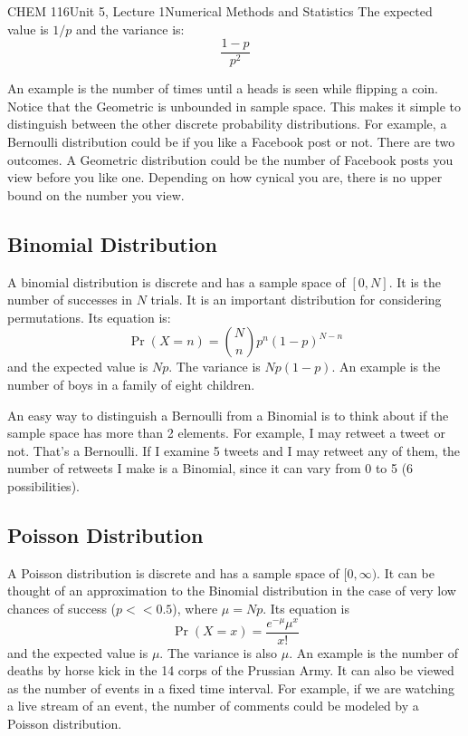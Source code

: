 \documentclass{article}
\begin{document}
\begin{tdoc}{CHEM 116}{Unit 5, Lecture 1}{Numerical Methods and Statistics}
The expected value is $1 / p$ and the variance is: 
\begin{equation}
\frac{1 - p}{p^2}
\end{equation}

An example is the number of times until a heads is seen while flipping
a coin. Notice that the Geometric is unbounded in sample space. This
makes it simple to distinguish between the other discrete probability
distributions. For example, a Bernoulli distribution could be if you
like a Facebook post or not. There are two outcomes. A Geometric
distribution could be the number of Facebook posts you view before you
like one. Depending on how cynical you are, there is no upper bound on
the number you view.

\subsection{Binomial Distribution}
A binomial distribution is discrete and has a sample space of
$[0,N]$. It is the number of successes in $N$ trials. It is an
important distribution for considering permutations. Its equation is:
\begin{equation}
\Pr(X=n) =  {N \choose n} p^n(1 - p)^{N - n}
\end{equation}
and the expected value is $Np$. The variance is $Np(1-p)$. An example
is the number of boys in a family of eight children.

An easy way to distinguish a Bernoulli from a Binomial is to think
about if the sample space has more than 2 elements. For example, I may
retweet a tweet or not. That's a Bernoulli. If I examine 5 tweets and
I may retweet any of them, the number of retweets I make is a
Binomial, since it can vary from 0 to 5 (6 possibilities).

\subsection{Poisson Distribution}
A Poisson distribution is discrete and has a sample space of
$[0,\infty)$. It can be thought of an approximation to the Binomial
  distribution in the case of very low chances of success ($p << 0.5$), 
  where $\mu = Np$. Its equation is
\begin{equation}
\Pr(X = x) = \frac{e^{-\mu}{\mu^x}}{x!}
\end{equation}
and the expected value is $\mu$. The variance is also $\mu$. An
example is the number of deaths by horse kick in the 14 corps of the
Prussian Army. It can also be viewed as the number of events in a
fixed time interval. For example, if we are watching a live stream of
an event, the number of comments could be modeled by a Poisson
distribution.


\end{tdoc}
\end{document}
